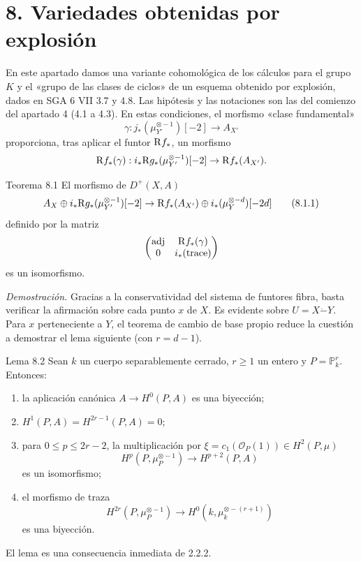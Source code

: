\section*{8. Variedades obtenidas por explosión}

En este apartado damos una variante cohomológica de los cálculos para el grupo $K$ y el «grupo de las clases de ciclos» de un esquema obtenido por explosión, dados en SGA 6 VII 3.7 y 4.8. Las hipótesis y las notaciones son las del comienzo del apartado 4 (4.1 a 4.3). En estas condiciones, el morfismo «clase fundamental»
\[
\gamma:j_*(\mu_{Y'}^{\otimes -1})[-2]\to A_{X'}
\]
proporciona, tras aplicar el funtor $\mathrm{R} f_*$, un morfismo
\[
\mathrm{R} f_*(\gamma):i_*\mathrm{R} g_*(\mu_{Y'}^{\otimes -1})[-2]\to \mathrm{R} f_*(A_{X'}).
\]

\begin{statement}{Teorema 8.1}
El morfismo de $D^+(X,A)$
\[
A_X\oplus i_*\mathrm{R} g_*(\mu_{Y'}^{\otimes -1})[-2]\to
\mathrm{R} f_*(A_{X'})\oplus i_*(\mu_Y^{\otimes -d})[-2d]
\tag{8.1.1}
\]
definido por la matriz
\[
\begin{pmatrix}
\operatorname{adj}&\mathrm{R} f_*(\gamma)\\
0&i_*(\operatorname{trace})
\end{pmatrix}
\]
es un isomorfismo.
\end{statement}

\emph{Demostración.} Gracias a la conservatividad del sistema de funtores fibra, basta verificar la afirmación sobre cada punto $x$ de $X$. Es evidente sobre $U=X\mathbin{\dot{-}}Y$. Para $x$ perteneciente a $Y$, el teorema de cambio de base propio reduce la cuestión a demostrar el lema siguiente (con $r=d-1$).

\begin{statement}{Lema 8.2}
Sean $k$ un cuerpo separablemente cerrado, $r\ge1$ un entero y $P=\mathbb P_k^r$. Entonces:
\begin{enumerate}[label=\alph*)]
\item la aplicación canónica $A\to H^0(P,A)$ es una biyección;
\item $H^1(P,A)=H^{2r-1}(P,A)=0$;
\item para $0\le p\le2r-2$, la multiplicación por $\xi=c_1(\mathcal O_P(1))\in H^2(P,\mu)$
\[
H^p(P,\mu_P^{\otimes -1})\to H^{p+2}(P,A)
\]
es un isomorfismo;
\item el morfismo de traza
\[
H^{2r}(P,\mu_P^{\otimes -1})\to H^0(k,\mu_k^{\otimes -(r+1)})
\]
es una biyección.
\end{enumerate}
\end{statement}

El lema es una consecuencia inmediata de 2.2.2.
